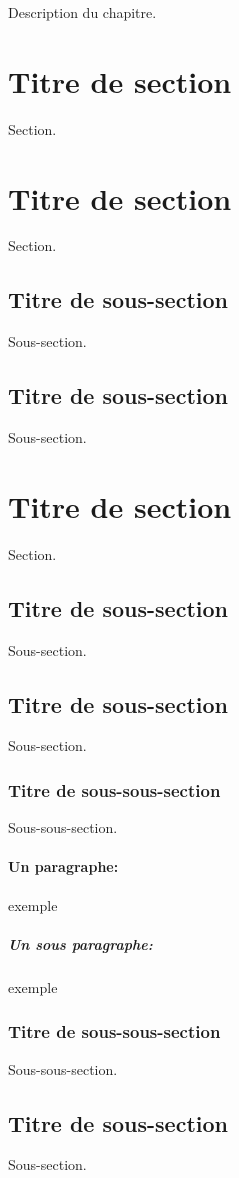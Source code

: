 
    Description du chapitre.

\section{Titre de section}

    Section.

\section{Titre de section}
        
    Section.
        
    \subsection{Titre de sous-section}
    
    Sous-section.
    
    \subsection{Titre de sous-section}

    Sous-section.
        
\section{Titre de section}

    Section.
        
    \subsection{Titre de sous-section}
    
    Sous-section.
    
    \subsection{Titre de sous-section}
    
    Sous-section.
    
    \subsubsection{Titre de sous-sous-section}
    
    Sous-sous-section.
    
    \paragraph{Un paragraphe:} exemple
    
    \subparagraph{Un sous paragraphe:} exemple
    
    \subsubsection{Titre de sous-sous-section}

    Sous-sous-section.
    
    \subsection{Titre de sous-section}
    
    Sous-section.
